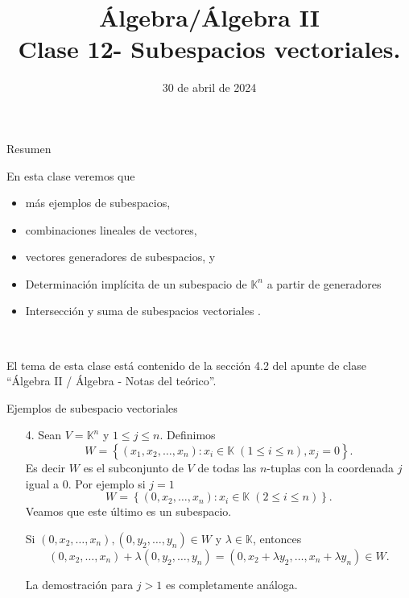 \documentclass{beamer} %
\title[Clase 12 - Subespacios vectoriales]{Álgebra/Álgebra II \\ Clase 12- Subespacios vectoriales.}
\author[]{}
\institute[]{\normalsize FAMAF / UNC
	\\[\baselineskip] ${}^{}$
	\\[\baselineskip]
}
\date[30/04/2024]{30 de abril de 2024}
\newcommand{\K}{\mathbb K}
\begin{document}
\begin{frame}
\maketitle
\end{frame}


\begin{frame}{Resumen}

    En esta clase veremos que
    \begin{itemize}
    \item más ejemplos de subespacios, 
        \item combinaciones lineales de vectores,
        \item vectores generadores de subespacios,  y
        \item Determinación implícita de un subespacio de $\mathbb{K}^n$ a
        partir de generadores
        \item Intersección y suma de subespacios vectoriales . 
    \end{itemize}
    

\

El tema de esta clase  está contenido de la sección 4.2 del apunte de clase ``Álgebra II / Álgebra - Notas del teórico''.
\end{frame}


    \begin{frame}{Ejemplos de subespacio vectoriales}
    
    
        \begin{enumerate}     
            \item[4.] Sean $V=\K^n$ y $1\le j \le n$. Definimos 
            $$
            W = \left\{ (x_1,x_2,\ldots,x_n): x_i \in \K\; (1 \le i \le n), x_j =0\right\}.
            $$
            Es decir $W$  es el subconjunto de $V$ de todas las $n$-tuplas con la coordenada $j$ igual a 0. Por ejemplo  si $j=1$ 
            $$
            W = \left\{ (0,x_2,\ldots,x_n): x_i \in \K \;(2 \le i \le n)\right\}.
            $$
            \pause
            Veamos que este último es un subespacio.
            
            Si $(0,x_2,\ldots,x_n), (0,y_2,\ldots,y_n) \in W$ y  $\lambda \in \K$,  entonces
            $$(0,x_2,\ldots,x_n)+ \lambda(0,y_2,\ldots,y_n) = (0,x_2+\lambda y_2,\ldots,x_n+\lambda y_n) \in W.$$
            
            
            La demostración para $j >1$ es completamente análoga. 
        \end{enumerate}

    
    \end{frame}
    
\end{document}
